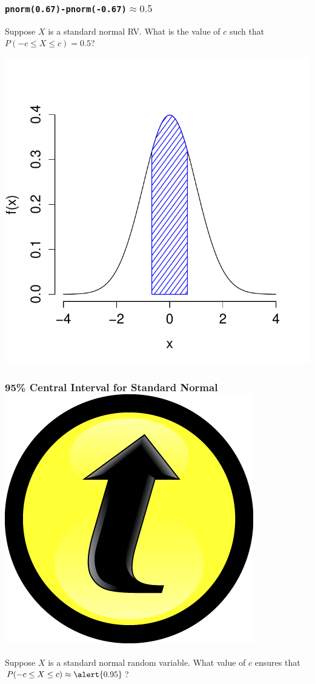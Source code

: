 \documentclass[handout]{beamer}
\begin{document}
\begin{frame}
\frametitle{\texttt{pnorm(0.67)-pnorm(-0.67)}$\approx 0.5$}
Suppose $X$ is a standard normal RV. What is the value of $c$ such that $P(-c \leq X\leq c ) = 0.5$?
\begin{center}
\includegraphics[scale = 0.55]{./images/tail5}
\end{center}
\end{frame}
\begin{frame}
\frametitle{95\% Central Interval for Standard Normal \hfill \includegraphics[scale = 0.05]{./images/clicker}}

Suppose $X$ is a standard normal random variable. What value of $c$ ensures that $P(-c \leq X \leq c) \approx \alert{0.95}$?

\end{frame}
\end{document}
